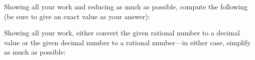 \documentclass[12pt,letterpaper]{exam}
\begin{document}
\begin{questions}



\newpage
\question Showing all your work and reducing as much as possible, compute the following (be sure to give an exact value as your answer):



\newpage
\question Showing all your work, either convert the given rational number to a decimal value or the given decimal number to a rational number---in either case, simplify as much as possible:




\end{questions}
\end{document}
